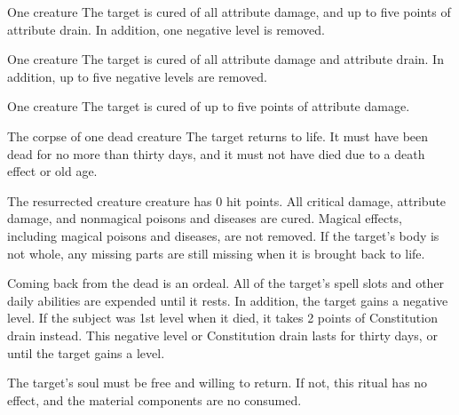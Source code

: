 \begin{spelltarget}{One creature}
    \spelleffect The target is cured of all attribute damage, and up to five points of attribute drain. In addition, one negative level is removed.
\end{spelltarget}

\begin{spelltarget}{One creature}
    \spelleffect The target is cured of all attribute damage and attribute drain. In addition, up to five negative levels are removed.
\end{spelltarget}

\begin{spelltarget}{One creature}
    \spelleffect The target is cured of up to five points of attribute damage.
\end{spelltarget}

\begin{spelltarget}{The corpse of one dead creature}
    \spelleffect The target returns to life. It must have been dead for no more than thirty days, and it must not have died due to a death effect or old age.

    The resurrected creature creature has 0 hit points. All critical damage, attribute damage, and nonmagical poisons and diseases are cured. Magical effects, including magical poisons and diseases, are not removed. If the target's body is not whole, any missing parts are still missing when it is brought back to life.

    \par Coming back from the dead is an ordeal. All of the target's spell slots and other daily abilities are expended until it rests. In addition, the target gains a negative level. If the subject was 1st level when it died, it takes 2 points of Constitution drain instead. This negative level or Constitution drain lasts for thirty days, or until the target gains a level.
\end{spelltarget}
\spellnotes The target's soul must be free and willing to return. If not, this ritual has no effect, and the material components are no consumed.

